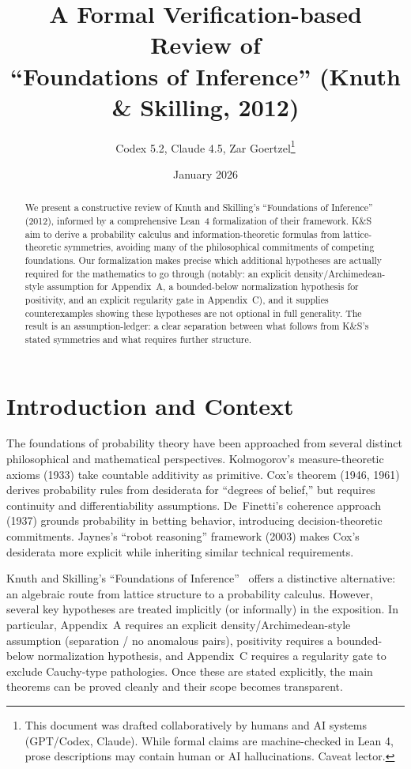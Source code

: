 \documentclass[11pt]{article}
\title{A Formal Verification-based Review of\\
``Foundations of Inference'' (Knuth \& Skilling, 2012)}
\author{Codex 5.2, Claude 4.5, Zar Goertzel\thanks{This document was drafted collaboratively by humans and AI systems (GPT/Codex, Claude). While formal claims are machine-checked in Lean 4, prose descriptions may contain human or AI hallucinations. Caveat lector.}}
\date{January 2026}
\begin{document}
\maketitle

\begin{abstract}
We present a constructive review of Knuth and Skilling's ``Foundations of Inference'' (2012),
informed by a comprehensive Lean~4 formalization of their framework.
K\&S aim to derive a probability calculus and information-theoretic formulas from lattice-theoretic
symmetries, avoiding many of the philosophical commitments of competing foundations.
Our formalization makes precise which additional hypotheses are actually required for the
mathematics to go through (notably: an explicit density/Archimedean-style assumption for Appendix~A,
a bounded-below normalization hypothesis for positivity, and an explicit regularity gate in Appendix~C),
and it supplies counterexamples showing these hypotheses are not optional in full generality.
The result is an assumption-ledger: a clear separation between what follows from K\&S's stated
symmetries and what requires further structure.
\end{abstract}

\tableofcontents
\newpage

\section{Introduction and Context}

The foundations of probability theory have been approached from several distinct
philosophical and mathematical perspectives. Kolmogorov's measure-theoretic axioms (1933)
take countable additivity as primitive. Cox's theorem (1946, 1961) derives probability
rules from desiderata for ``degrees of belief,'' but requires continuity and
differentiability assumptions. De~Finetti's coherence approach (1937) grounds probability
in betting behavior, introducing decision-theoretic commitments. Jaynes's ``robot reasoning''
framework (2003) makes Cox's desiderata more explicit while inheriting similar technical
requirements.

Knuth and Skilling's ``Foundations of Inference''~\cite{knuth2012} offers a distinctive
alternative: an algebraic route from lattice structure to a probability calculus.
However, several key hypotheses are treated implicitly (or informally) in the exposition.
In particular, Appendix~A requires an explicit density/Archimedean-style assumption
(separation / no anomalous pairs), positivity requires a bounded-below normalization hypothesis,
and Appendix~C requires a regularity gate to exclude Cauchy-type pathologies.
Once these are stated explicitly, the main theorems can be proved cleanly and their scope becomes
transparent.
\end{document}
